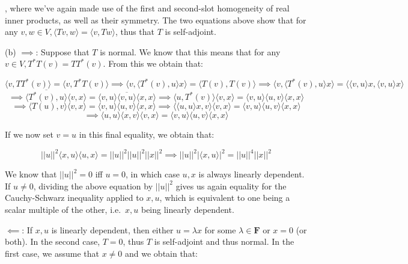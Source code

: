 \begin{solution}
    , where we've again made use of the first and second-slot homogeneity of real inner products, as well as their symmetry. The two equations above show that for any $v, w \in V, \langle Tv, w \rangle = \langle v, Tw \rangle$, thus that $T$ is self-adjoint.

    (b) $\implies$: Suppose that $T$ is normal. We know that this means that for any $v \in V, T^*T(v) = TT^*(v)$. From this we obtain that:

    $$\langle v, TT^*(v) \rangle = \langle v, T^*T(v) \rangle \implies \langle v, \langle T^*(v), u \rangle x \rangle = \langle T(v), T(v) \rangle \implies \langle v, \langle T^*(v), u \rangle x \rangle = \langle \langle v, u \rangle x, \langle v, u \rangle x \rangle $$
    $$\implies \overline{\langle T^*(v), u \rangle}\langle v, x \rangle = \langle v, u \rangle \overline{\langle v, u \rangle}\langle x, x \rangle \implies \langle u, T^*(v) \rangle \langle v, x \rangle = \langle v, u \rangle \langle u, v \rangle \langle x, x \rangle$$
    $$\implies \langle T(u), v \rangle \langle v, x \rangle = \langle v, u \rangle \langle u, v \rangle \langle x, x \rangle \implies \langle \langle u, u \rangle x, v \rangle \langle v, x \rangle = \langle v, u \rangle \langle u, v \rangle \langle x, x \rangle$$
    $$\implies \langle u, u \rangle \langle x , v \rangle \langle v, x \rangle = \langle v, u \rangle \langle u, v \rangle \langle x, x \rangle$$

    If we now set $v = u$ in this final equality, we obtain that:

    $$\lvert \lvert u \rvert \rvert^2 \langle x, u \rangle \langle u, x \rangle = \lvert \lvert u \rvert \rvert^2 \lvert \lvert u \rvert \rvert^2 \lvert \lvert x \rvert \rvert^2 \implies \lvert \lvert u \rvert \rvert^2 \lvert \langle x, u \rangle \rvert^2 = \lvert \lvert u \rvert \rvert^4 \lvert \lvert x \rvert \rvert^2$$

    We know that $\lvert \lvert u \rvert \rvert^2 = 0$ iff $u = 0$, in which case $u, x$ is always linearly dependent. If $u \neq 0$, dividing the above equation by $\lvert \lvert u \rvert \rvert^2$ gives us again equality for the Cauchy-Schwarz inequality applied to $x, u$, which is equivalent to one being a scalar multiple of the other, i.e.\ $x, u$ being linearly dependent.

    $\impliedby$: If $x, u$ is linearly dependent, then either $u = \lambda x$ for some $\lambda \in \mathbf{F}$ or $x = 0$ (or both). In the second case, $T = 0$, thus $T$ is self-adjoint and thus normal. In the first case, we assume that $x \neq 0$ and we obtain that:


\end{solution}
